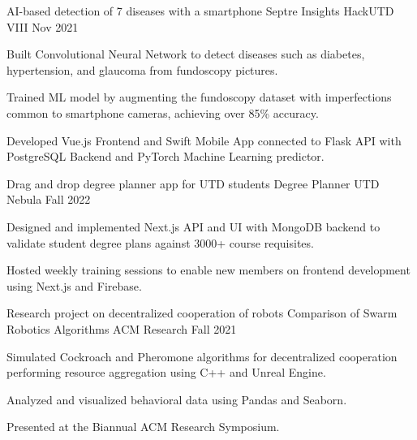 
\begin{cventries}

\cventry
{AI-based detection of 7 diseases with a smartphone}
{Septre Insights}
{HackUTD VIII}
{Nov 2021}
{
\begin{cvitems}
\item {Built Convolutional Neural Network to detect diseases such as diabetes,
	hypertension, and glaucoma from fundoscopy pictures.}
\item {Trained ML model by augmenting the fundoscopy dataset with imperfections
	common to smartphone cameras, achieving over 85\% accuracy.}
\item {Developed Vue.js Frontend and Swift Mobile App connected to Flask API
	with PostgreSQL Backend and PyTorch Machine Learning predictor.}
\end{cvitems}
}

\cventry
{Drag and drop degree planner app for UTD students}
{Degree Planner}
{UTD Nebula}
{Fall 2022}
{
\begin{cvitems}
\item {Designed and implemented Next.js API and UI with MongoDB backend to
	validate student degree plans against 3000+ course requisites.}
\item {Hosted weekly training sessions to enable new members on frontend
	development using Next.js and Firebase.}
\end{cvitems}
}

\cventry
{Research project on decentralized cooperation of robots}
{Comparison of Swarm Robotics Algorithms}
{ACM Research}
{Fall 2021}
{
\begin{cvitems}
\item {Simulated Cockroach and Pheromone algorithms for decentralized
	cooperation performing resource aggregation using C++ and Unreal
	Engine.}
\item {Analyzed and visualized behavioral data using Pandas and Seaborn.}
\item {Presented at the Biannual ACM Research Symposium.}
\end{cvitems}
}

\end{cventries}
